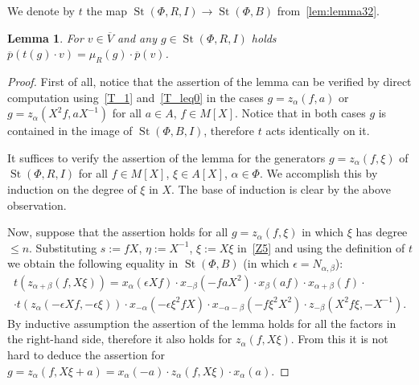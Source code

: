 \documentclass[oneside, 8pt]{amsart}
\newtheorem{lemma}{Lemma}
\theoremstyle{remark}
\theoremstyle{definition}
\numberwithin{lemma}{section}
\numberwithin{prop}{section}
\numberwithin{corollary}{section}
\DeclareMathOperator{\St}{St}
\numberwithin{equation}{section}
\begin{document}
We denote by $t$ the map $\St(\Phi, R, I) \to \St(\Phi, B)$ from~\cref{lem:lemma32}.
\begin{lemma} For $v\in \overline{V}$ and any $g \in \St(\Phi, R, I)$ holds $\overline{p}(t(g) \cdot v) = \mu_R(g) \cdot \overline{p}(v)$. \end{lemma}
\begin{proof} First of all, notice that the assertion of the lemma can be verified by direct computation using~\eqref{T_1} and~\eqref{T_leq0} in the cases $g = z_\alpha(f, a)$ or $g = z_\alpha(X^2f, aX^{-1})$ for all $a\in A$, $f\in M[X]$. Notice that in both cases $g$ is contained in the image of $\St(\Phi, B, I)$, therefore $t$ acts identically on it.

It suffices to verify the assertion of the lemma for the generators $g = z_\alpha(f, \xi)$ of $\St(\Phi, R, I)$ for all $f \in M[X]$, $\xi\in A[X]$, $\alpha \in \Phi$. We accomplish this by 
induction on the degree of $\xi$ in $X$. The base of induction is clear by the above observation.

Now, suppose that the assertion holds for all $g = z_\alpha(f, \xi)$ in which $\xi$ has degree $\leq n$.
Substituting $s := fX$, $\eta := X^{-1}$, $\xi := X\xi$ in~\eqref{Z5} and using the definition of $t$ we obtain the following equality in $\St(\Phi, B)$ (in which $\epsilon = N_{\alpha, \beta}$):
\begin{multline*}
 t(z_{\alpha+\beta}(f, X\xi)) = x_\alpha(\epsilon Xf) \cdot x_{-\beta}(-faX^2) \cdot x_{\beta}(af) \cdot x_{\alpha+\beta}(f) \cdot \\ \cdot t(z_\alpha(-\epsilon Xf, -\epsilon \xi)) \cdot x_{-\alpha}(-\epsilon \xi^2fX) \cdot x_{-\alpha-\beta}(- f \xi^2X^2) \cdot z_{-\beta}(X^2f\xi, -X^{-1}).
\end{multline*}
By inductive assumption the assertion of the lemma holds for all the factors in the right-hand side, therefore it also holds for  $z_\alpha(f, X\xi)$. From this it is not hard to deduce the assertion for $g = z_\alpha(f, X\xi + a) = x_\alpha(-a) \cdot z_\alpha(f, X\xi) \cdot x_\alpha(a)$. 
\end{proof}

\printbibliography
\end{document}
